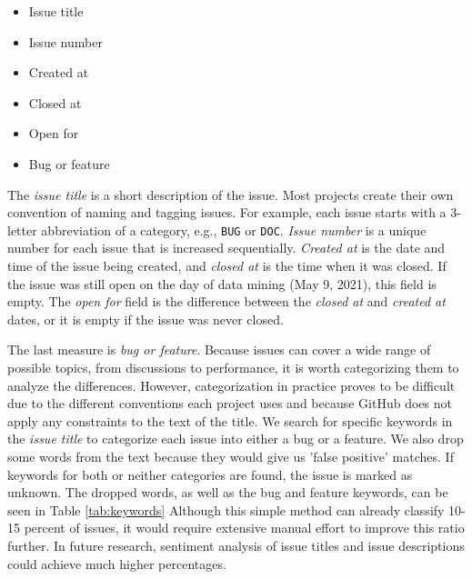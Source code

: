 \begin{itemize}
    \item Issue title
    \item Issue number
    \item Created at
    \item Closed at
    \item Open for
    \item Bug or feature
\end{itemize}

The \textit{issue title} is a short description of the issue. Most projects create their own convention of naming and tagging issues. For example, each issue starts with a 3-letter abbreviation of a category, e.g., \texttt{BUG} or \texttt{DOC}. \textit{Issue number} is a unique number for each issue that is increased sequentially. \textit{Created at} is the date and time of the issue being created, and \textit{closed at} is the time when it was closed. If the issue was still open on the day of data mining (May 9, 2021), this field is empty. The \textit{open for} field is the difference between the \textit{closed at} and \textit{created at} dates, or it is empty if the issue was never closed.

The last measure is \textit{bug or feature}. Because issues can cover a wide range of possible topics, from discussions to performance, it is worth categorizing them to analyze the differences. However, categorization in practice proves to be difficult due to the different conventions each project uses and because GitHub does not apply any constraints to the text of the title. We search for specific keywords in the \textit{issue title} to categorize each issue into either a bug or a feature. We also drop some words from the text because they would give us 'false positive' matches. If keywords for both or neither categories are found, the issue is marked as unknown. The dropped words, as well as the bug and feature keywords, can be seen in Table \ref{tab:keywords} Although this simple method can already classify 10-15 percent of issues, it would require extensive manual effort to improve this ratio further. In future research, sentiment analysis of issue titles and issue descriptions could achieve much higher percentages.

